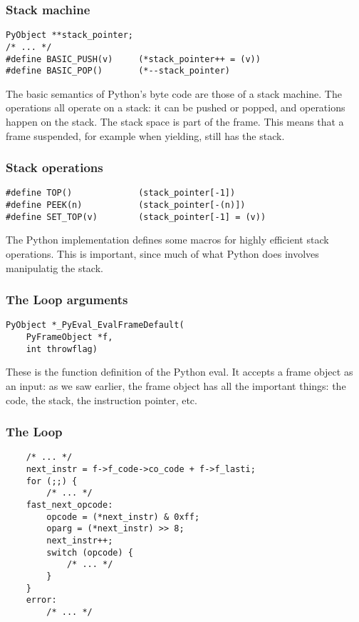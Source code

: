 \begin{frame}[fragile]
\frametitle{Stack machine}

\begin{lstlisting}
PyObject **stack_pointer;
/* ... */
#define BASIC_PUSH(v)     (*stack_pointer++ = (v))
#define BASIC_POP()       (*--stack_pointer)
\end{lstlisting}
\end{frame}

The basic semantics of Python's byte code are those of a stack machine.
The operations all operate on a stack:
it can be pushed or popped,
and operations happen on the stack.
The stack space is part of the frame.
This means that a frame suspended,
for example when yielding,
still has the stack.

\begin{frame}[fragile]
\frametitle{Stack operations}

\begin{lstlisting}
#define TOP()             (stack_pointer[-1])
#define PEEK(n)           (stack_pointer[-(n)])
#define SET_TOP(v)        (stack_pointer[-1] = (v))
\end{lstlisting}
\end{frame}

The Python implementation defines some macros for highly
efficient stack operations. This is important,
since much of what Python does involves manipulatig the
stack.

\begin{frame}[fragile]
\frametitle{The Loop arguments}

\begin{lstlisting}
PyObject *_PyEval_EvalFrameDefault(
    PyFrameObject *f,
    int throwflag)
\end{lstlisting}
\end{frame}

These is the function definition of the Python eval.
It accepts a frame object as an input:
as we saw earlier,
the frame object has all the important things:
the code,
the stack,
the instruction pointer,
etc.

\begin{frame}[fragile]
\frametitle{The Loop}

\begin{lstlisting}
    /* ... */
    next_instr = f->f_code->co_code + f->f_lasti;
    for (;;) {
        /* ... */
    fast_next_opcode:
        opcode = (*next_instr) & 0xff;
        oparg = (*next_instr) >> 8;
        next_instr++;
        switch (opcode) {
            /* ... */
        }
    }
    error:
        /* ... */
\end{lstlisting}
\end{frame}

